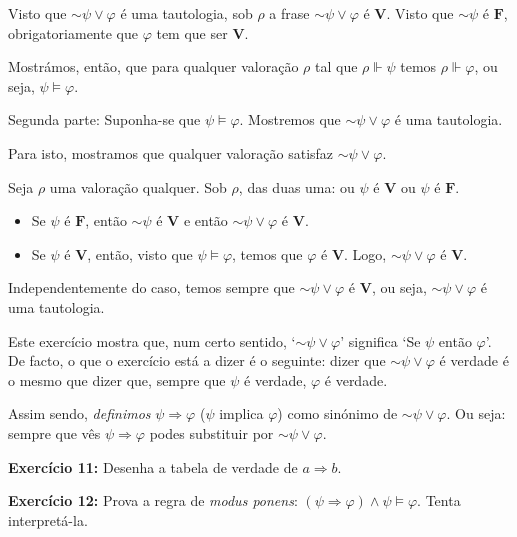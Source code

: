 \documentclass{article}
\theoremstyle{definition}
\theoremstyle{remark}
\newcommand{\V}{\mathbf{V}}
\newcommand{\F}{\mathbf{F}}
\newcommand*{\lneg}{\mathord{\sim}}
\begin{document}
	Visto que $\lneg \psi \lor \varphi$ é uma tautologia, sob $\rho$ a frase $\lneg \psi \lor \varphi$ é $\V$. Visto que $\lneg \psi$ é $\F$, obrigatoriamente que $\varphi$ tem que ser $\V$.
	
	Mostrámos, então, que para qualquer valoração $\rho$ tal que $\rho \Vdash \psi$ temos $\rho \Vdash \varphi$, ou seja, $\psi \vDash \varphi$.
	
	\smallskip
	
	Segunda parte: Suponha-se que $\psi \vDash \varphi$. Mostremos que $\lneg \psi \lor \varphi$ é uma tautologia.
	
	Para isto, mostramos que qualquer valoração satisfaz $\lneg \psi \lor \varphi$.
	
	Seja $\rho$ uma valoração qualquer. Sob $\rho$, das duas uma: ou $\psi$ é $\V$ ou $\psi$ é $\F$.
	
	\begin{itemize}	
	\item Se $\psi$ é $\F$, então $\lneg \psi$ é $\V$ e então $\lneg \psi \lor \varphi$ é $\V$.
	
	\item Se $\psi$ é $\V$, então, visto que $\psi \vDash \varphi$, temos que $\varphi$ é $\V$. Logo, $\lneg \psi \lor \varphi$ é $\V$.
	\end{itemize}
	
	Independentemente do caso, temos sempre que $\lneg \psi \lor \varphi$ é $\V$, ou seja, $\lneg \psi \lor \varphi$ é uma tautologia.
	
	\medskip
	
	Este exercício mostra que, num certo sentido, `$\lneg \psi \lor \varphi$' significa `Se $\psi$ então $\varphi$'. De facto, o que o exercício está a dizer é o seguinte: dizer que $\lneg \psi \lor \varphi$ é verdade é o mesmo que dizer que, sempre que $\psi$ é verdade, $\varphi$ é verdade.
	
	 Assim sendo, \emph{definimos} $\psi \Rightarrow \varphi$ ($\psi$ implica $\varphi$) como sinónimo de $\lneg \psi \lor \varphi$. Ou seja: sempre que vês $\psi \Rightarrow \varphi$ podes substituir por $\lneg \psi \lor \varphi$.
	
	\textbf{Exercício 11:} Desenha a tabela de verdade de $a \Rightarrow b$.
	
	\smallskip
	
	\textbf{Exercício 12:} Prova a regra de \textit{modus ponens}: $(\psi \Rightarrow \varphi) \land \psi \vDash \varphi$. Tenta interpretá-la.
	
	\smallskip
	
\end{document}
